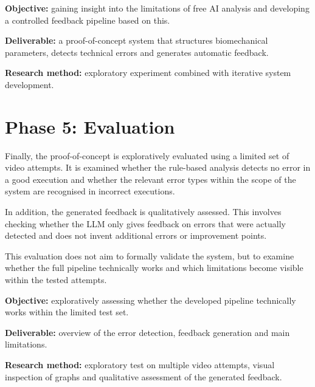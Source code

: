 \textbf{Objective:} gaining insight into the limitations of free AI analysis and developing a controlled feedback pipeline based on this.  

\textbf{Deliverable:} a proof-of-concept system that structures biomechanical parameters, detects technical errors and generates automatic feedback.  

\textbf{Research method:} exploratory experiment combined with iterative system development.

\section{Phase 5: Evaluation}

Finally, the proof-of-concept is exploratively evaluated using a limited set of video attempts. It is examined whether the rule-based analysis detects no error in a good execution and whether the relevant error types within the scope of the system are recognised in incorrect executions.

In addition, the generated feedback is qualitatively assessed. This involves checking whether the LLM only gives feedback on errors that were actually detected and does not invent additional errors or improvement points.

This evaluation does not aim to formally validate the system, but to examine whether the full pipeline technically works and which limitations become visible within the tested attempts.

\textbf{Objective:} exploratively assessing whether the developed pipeline technically works within the limited test set.  

\textbf{Deliverable:} overview of the error detection, feedback generation and main limitations.  

\textbf{Research method:} exploratory test on multiple video attempts, visual inspection of graphs and qualitative assessment of the generated feedback.
